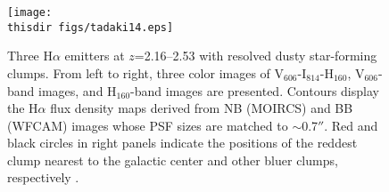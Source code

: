 \begin{figure}%
\centerline{
\texttt{[image: \\thisdir figs/tadaki14.eps]}
}
\caption{
Three H$\alpha$ emitters at $z$=2.16--2.53 with resolved dusty
 star-forming clumps. From left to right, three color images of
 V$_{606}$-I$_{814}$-H$_{160}$, V$_{606}$-band images, and
 H$_{160}$-band images are presented. Contours display the H$\alpha$
 flux density maps derived from NB (MOIRCS) and BB (WFCAM) images whose
 PSF sizes are matched to $\sim$0.7$''$. Red and black circles in right
 panels indicate the positions of the reddest clump nearest to the
 galactic center and other bluer clumps, respectively 
 \citep{tadaki14}.
}
\label{fig:}
\end{figure}








%
\clearpage
